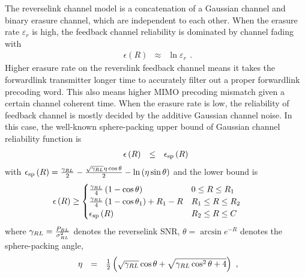 \documentclass[10pt,fleqn, twocolumn]{IEEEtran}
\begin{document}
The reverselink channel model is a concatenation of a Gaussian
channel and binary erasure channel, which are independent to each
other. When the erasure rate $\varepsilon_{r}$ is high, the
feedback channel reliability is dominated by channel fading with
\begin{equation}%
\begin{array}{rcl}
\epsilon\left(R\right)&\approx&\ln\varepsilon_{r}
\end{array}.
\end{equation}
Higher erasure rate on the reverslink feedback channel means it
takes the forwardlink transmitter longer time to accurately filter
out a proper forwardlink precoding word. This also means higher
MIMO precoding mismatch given a certain channel coherent time.
When the erasure rate is low, the reliability of feedback channel
is mostly decided by the additive Gaussian channel noise. In this
case, the well-known sphere-packing upper bound of Gaussian
channel reliability function is
\begin{equation}%
\begin{array}{rcl}
\epsilon\left(R\right)&\leq&\epsilon_{\rm sp}\left(R\right)
\end{array}\label{reliability_upper_bound}
\end{equation}
\noindent with $\epsilon_{\rm
sp}\left(R\right)=\frac{\gamma_{\mbox{\tiny
RL}}}{2}-\frac{\sqrt{\gamma_{\mbox{\tiny
RL}}}\eta\cos\theta}{2}-\ln\left(\eta\sin\theta\right)$ and the
lower bound is
\begin{equation}\hspace{-0.30in}
\begin{array}{l}
\epsilon\left(R\right)\geq\begin{cases} \frac{\gamma_{\mbox{\tiny
RL}}}{4}\left(1-\cos\theta\right) &
0\leq R\leq R_{1} \\
\frac{\gamma_{\mbox{\tiny RL}}}{4}\left(1-\cos\theta_{1}\right)
+R_{1}-R&
R_{1}\leq R\leq R_{2} \\
\epsilon_{\rm sp}\left(R\right) &R_{2}\leq R\leq C
\end{cases}
\end{array}\label{reliability_lower_bound}
\end{equation}
\noindent where $\gamma_{\mbox{\tiny RL}}=\frac{P_{\mbox{\tiny
RL}}}{\sigma^2_{\mbox{\tiny RL}}}$ denotes the reverselink SNR,
$\theta=\arcsin e^{-R}$ denotes the sphere-packing angle,
\begin{equation}\hspace{-0.0in}
\begin{array}{rcl}
\eta&=&\frac{1}{2}\left(\sqrt{\gamma_{\mbox{\tiny
RL}}}\cos\theta+\sqrt{\gamma_{\mbox{\tiny
RL}}\cos^2\theta+4}\right)
\end{array},
\end{equation}
\end{document}
